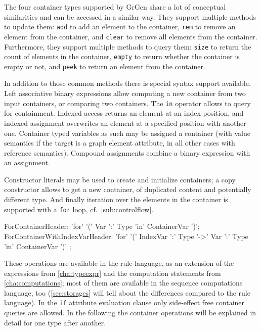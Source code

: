 The four container types supported by GrGen share a lot of conceptual similarities and can be accessed in a similar way.
They support multiple methods to update them:
\texttt{add} to add an element to the container,
\texttt{rem} to remove an element from the container,
and \texttt{clear} to remove all elements from the container.
Furthermore, they support multiple methods to query them:
\texttt{size} to return the count of elements in the container,
\texttt{empty} to return whether the container is empty or not,
and \texttt{peek} to return an element from the container.

In addition to those common methods there is special syntax support available.
Left associative binary expressions allow computing a new container from two input containers, or comparing two containers.
The \texttt{in} operator allows to query for containment.
Indexed access returns an element at an index position, and indexed assignment overwrites an element at a specified position with another one.
Container typed variables as such may be assigned a container (with value semantics if the target is a graph element attribute, in all other cases with reference semantics).
Compound assignments combine a binary expression with an assignment.

Constructor literals may be used to create and initialize containers;
a copy constructor allows to get a new container, of duplicated content and potentially different type.
And finally iteration over the elements in the container is supported with a \texttt{for} loop, cf.~\ref{sub:controlflow}.

\begin{rail}
  ForContainerHeader: 'for' '(' Var ':' Type 'in' ContainerVar ')';
  ForContainerWithIndexVarHeader: 'for' '(' IndexVar ':' Type '->' Var ':' Type 'in' ContainerVar ')' ;
\end{rail}

These operations are available in the rule language, as an extension of the expressions from \ref{cha:typeexpr} and the computation statements from \ref{cha:computations}; 
most of them are available in the sequence computations language, too
(\ref{sec:storages} will tell about the differences compared to the rule language).
In the \texttt{if} attribute evaluation clause only side-effect free container queries are allowed.
In the following the container operations will be explained in detail for one type after another.


